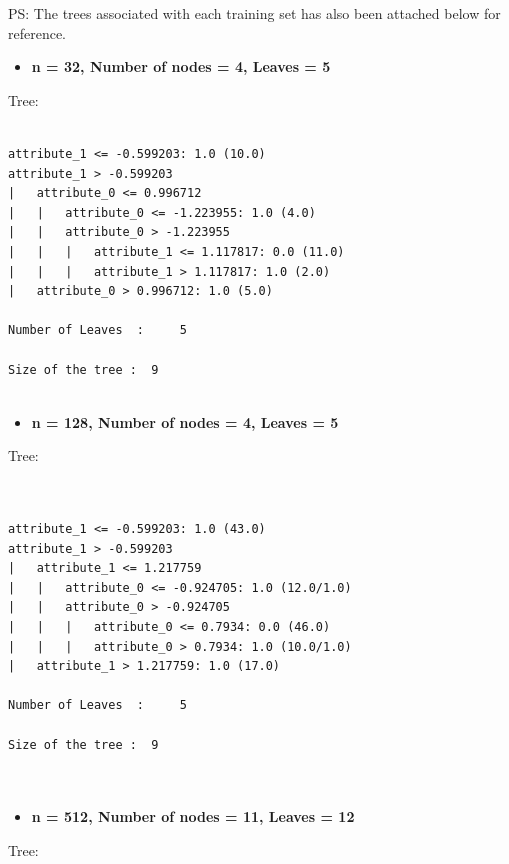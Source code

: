 \documentclass[a4paper]{article}
\theoremstyle{definition}
\newenvironment{soln}{
    \leavevmode\color{blue}\ignorespaces
}{}
\begin{document}
\begin{soln}
PS: The trees associated with each training set has also been attached below for reference.
	
\begin{itemize}
	\item \textbf{n = 32, Number of nodes = 4, Leaves = 5}
\end{itemize}
Tree:


\begin{lstlisting}

attribute_1 <= -0.599203: 1.0 (10.0)
attribute_1 > -0.599203
|   attribute_0 <= 0.996712
|   |   attribute_0 <= -1.223955: 1.0 (4.0)
|   |   attribute_0 > -1.223955
|   |   |   attribute_1 <= 1.117817: 0.0 (11.0)
|   |   |   attribute_1 > 1.117817: 1.0 (2.0)
|   attribute_0 > 0.996712: 1.0 (5.0)

Number of Leaves  : 	5

Size of the tree : 	9


\end{lstlisting}

\vspace{1cm}



\begin{itemize}
	\item \textbf{n = 128, Number of nodes = 4, Leaves = 5}
\end{itemize}
Tree:


\begin{lstlisting}


attribute_1 <= -0.599203: 1.0 (43.0)
attribute_1 > -0.599203
|   attribute_1 <= 1.217759
|   |   attribute_0 <= -0.924705: 1.0 (12.0/1.0)
|   |   attribute_0 > -0.924705
|   |   |   attribute_0 <= 0.7934: 0.0 (46.0)
|   |   |   attribute_0 > 0.7934: 1.0 (10.0/1.0)
|   attribute_1 > 1.217759: 1.0 (17.0)

Number of Leaves  : 	5

Size of the tree : 	9



\end{lstlisting}

\vspace{1cm}


\begin{itemize}
	\item \textbf{n = 512, Number of nodes = 11, Leaves = 12}
\end{itemize}
Tree:


\begin{lstlisting}



\end{lstlisting}
\end{soln}
\end{document}
